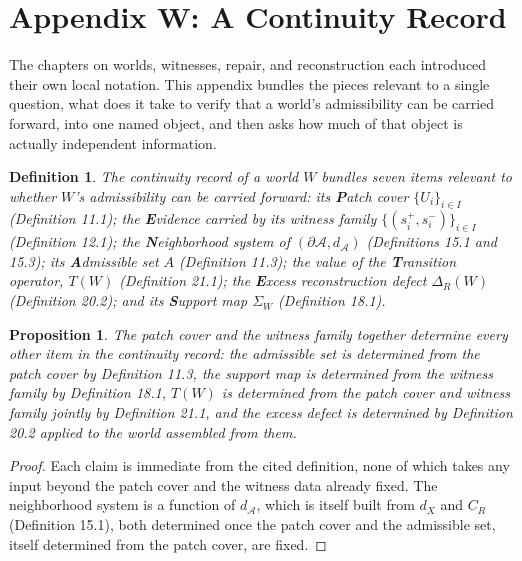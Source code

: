 \documentclass[11pt]{book}
\newtheorem*{appendixdefinition}{Definition}
\newtheorem*{appendixproposition}{Proposition}
\begin{document}
\chapter*{Appendix W: A Continuity Record}

The chapters on worlds, witnesses, repair, and reconstruction each introduced their own local notation. This appendix bundles the pieces relevant to a single question, what does it take to verify that a world's admissibility can be carried forward, into one named object, and then asks how much of that object is actually independent information.

\begin{appendixdefinition}
The \emph{continuity record} of a world $W$ bundles seven items relevant to whether $W$'s admissibility can be carried forward: its \textbf{P}atch cover $\{U_i\}_{i\in I}$ (Definition 11.1); the \textbf{E}vidence carried by its witness family $\{(s_i^+, s_i^-)\}_{i \in I}$ (Definition 12.1); the \textbf{N}eighborhood system of $(\partial \mathcal A, d_{\mathcal A})$ (Definitions 15.1 and 15.3); its \textbf{A}dmissible set $A$ (Definition 11.3); the value of the \textbf{T}ransition operator, $T(W)$ (Definition 21.1); the \textbf{E}xcess reconstruction defect $\Delta_R(W)$ (Definition 20.2); and its \textbf{S}upport map $\Sigma_W$ (Definition 18.1).
\end{appendixdefinition}

\begin{appendixproposition}
The patch cover and the witness family together determine every other item in the continuity record: the admissible set is determined from the patch cover by Definition 11.3, the support map is determined from the witness family by Definition 18.1, $T(W)$ is determined from the patch cover and witness family jointly by Definition 21.1, and the excess defect is determined by Definition 20.2 applied to the world assembled from them.
\end{appendixproposition}

\begin{proof}
Each claim is immediate from the cited definition, none of which takes any input beyond the patch cover and the witness data already fixed. The neighborhood system is a function of $d_{\mathcal A}$, which is itself built from $d_X$ and $C_R$ (Definition 15.1), both determined once the patch cover and the admissible set, itself determined from the patch cover, are fixed.
\end{proof}
\end{document}
